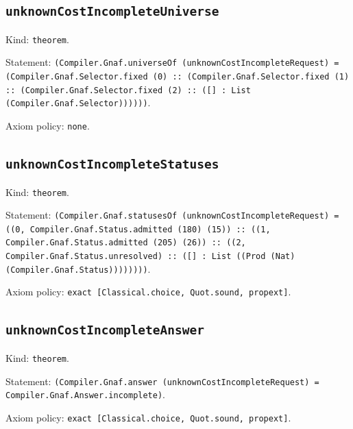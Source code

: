 \documentclass[11pt]{article}
\begin{document}
\subsection*{\texttt{unknownCostIncompleteUniverse}}
\noindent Kind: \texttt{theorem}.\par
\noindent Statement: \texttt{(Compiler.Gnaf.universeOf (unknownCostIncompleteRequest) = (Compiler.Gnaf.Selector.fixed (0) :: (Compiler.Gnaf.Selector.fixed (1) :: (Compiler.Gnaf.Selector.fixed (2) :: ([] : List (Compiler.Gnaf.Selector))))))}.\par
\noindent Axiom policy: \texttt{none}.\par
\subsection*{\texttt{unknownCostIncompleteStatuses}}
\noindent Kind: \texttt{theorem}.\par
\noindent Statement: \texttt{(Compiler.Gnaf.statusesOf (unknownCostIncompleteRequest) = ((0, Compiler.Gnaf.Status.admitted (180) (15)) :: ((1, Compiler.Gnaf.Status.admitted (205) (26)) :: ((2, Compiler.Gnaf.Status.unresolved) :: ([] : List ((Prod (Nat) (Compiler.Gnaf.Status))))))))}.\par
\noindent Axiom policy: \texttt{exact [Classical.choice, Quot.sound, propext]}.\par
\subsection*{\texttt{unknownCostIncompleteAnswer}}
\noindent Kind: \texttt{theorem}.\par
\noindent Statement: \texttt{(Compiler.Gnaf.answer (unknownCostIncompleteRequest) = Compiler.Gnaf.Answer.incomplete)}.\par
\noindent Axiom policy: \texttt{exact [Classical.choice, Quot.sound, propext]}.\par
\end{document}

